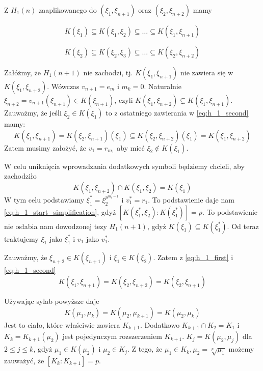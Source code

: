 Z $H_1(n)$ zaaplikowanego do $\left(\xi_1, \xi_{n+1}\right)$ oraz $\left(\xi_2,
\xi_{n+2}\right)$ mamy

\begin{equation}
  K\left(\xi_1\right) \subseteq
  K\left(\xi_1, \xi_2\right) \subseteq
  \ldots \subseteq
  K\left(\xi_1, \xi_{n+1}\right)
  \label{eq:h_1_first}
\end{equation}

\begin{equation}
  K\left(\xi_2\right) \subseteq
  K\left(\xi_2, \xi_3\right) \subseteq
  \ldots \subseteq
  K\left(\xi_2, \xi_{n+2}\right)
  \label{eq:h_1_second}
\end{equation}

Załóżmy, że $H_1(n+1)$ nie zachodzi, tj. $K\left(\xi_1, \xi_{n+1}\right)$ nie
zawiera się w $K\left(\xi_1, \xi_{n+2}\right)$. Wówczas $v_{n+1} = e_m$ i $m_k =
0$.
Naturalnie $\xi_{n+2} = v_{n+1}\left(\xi_{n+1}\right) \in
K\left(\xi_{n+1}\right)$, czyli 
${K\left(\xi_1, \xi_{n+2}\right) \subsetneq
K\left(\xi_1, \xi_{n+1}\right)}$.
Zauważmy, że jeśli $\xi_2 \in K\left(\xi_1\right)$ to z ostatniego zawierania w
\ref{eq:h_1_second} mamy:
\[
  K\left(\xi_1, \xi_{n+1}\right) =
  K\left(\xi_2, \xi_{n+1}\right)\left(\xi_1\right) \subseteq
  K\left(\xi_2, \xi_{n+2}\right)\left(\xi_1\right) =
K\left(\xi_1, \xi_{n+2}\right)\]
Zatem musimy założyć, że $v_1 = r_{m_1}$ aby mieć $\xi_2 \not \in
K\left(\xi_1\right)$.

W celu uniknięcia wprowadzania dodatkowych symboli będziemy chcieli, aby
zachodziło 
\begin{equation}
K\left(\xi_1, \xi_{n+2}\right) \cap
K\left(\xi_1, \xi_2\right) = K\left(\xi_1\right)
\label{eq:h_1_start_simplification}
\end{equation}
W tym celu podstawiamy $\xi_1^* = \xi_2^{p^{m_1-1}}$ i $v_1^* = r_1$. To
podstawienie daje nam \ref{eq:h_1_start_simplification}, gdyż
$\left[K\left(\xi_1^*, \xi_2\right):K\left(\xi_1^*\right)\right] = p$.
To podstawienie nie osłabia nam dowodzonej tezy $H_1(n+1)$, gdyż
$K\left(\xi_1\right) \subseteq K\left(\xi_1^*\right)$. Od teraz traktujemy
$\xi_1$ jako $\xi_1^*$ i $v_1$ jako $v_1^*$.

Zauważmy, że
$\xi_{n+2} \in K\left(\xi_{n+1}\right)$ i $\xi_{1} \in K\left(\xi_{2}\right)$.
Zatem z \ref{eq:h_1_first} i \ref{eq:h_1_second}
\[
  K\left(\xi_1, \xi_{n+1}\right) =
  K\left(\xi_2, \xi_{n+2}\right) =
  K\left(\xi_2, \xi_{n+1}\right)
\]

Używając sylab powyższe daje
\[
  K\left(\mu_1, \mu_{k}\right) =
  K\left(\mu_2, \mu_{k+1}\right) =
  K\left(\mu_2, \mu_{k}\right)
\]
Jest to ciało, które właściwie zawiera $K_{k+1}$. Dodatkowo $K_{k+1} \cap K_2 =
K_1$ i $K_k = K_{k+1}\left(\mu_2\right)$ jest pojedynczym rozszerzeniem
$K_{k+1}$.
$K_j = K\left(\mu_2, \mu_j\right)$ dla $2 \leq j \leq k$, gdyż $\mu_1 \in
K\left(\mu_2\right)$ i $\mu_2 \in K_j$.
Z tego, że $\mu_1 \in K_k, \mu_2 = \sqrt[p]{\mu_1}$ możemy zauważyć, że
$\left[K_k : K_{k+1}\right] = p$.

